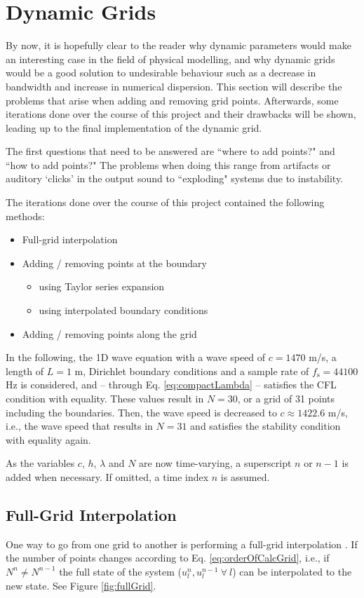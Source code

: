 \documentclass[dvipsnames, preprint]{JASA}
\begin{document}
\section{Dynamic Grids}
By now, it is hopefully clear to the reader why dynamic parameters would make an interesting case in the field of physical modelling, and why dynamic grids would be a good solution to undesirable behaviour such as a decrease in bandwidth and increase in numerical dispersion. This section will describe the problems that arise when adding and removing grid points. Afterwards, some iterations done over the course of this project and their drawbacks will be shown, leading up to the final implementation of the dynamic grid. 

The first questions that need to be answered are ``where to add points?" and ``how to add points?" The problems when doing this range from artifacts or auditory `clicks' in the output sound to ``exploding" systems due to instability.


The iterations done over the course of this project contained the following methods:
\begin{itemize}
    \item Full-grid interpolation
    \item Adding / removing points at the boundary
    \begin{itemize}
        \item using Taylor series expansion
        \item using interpolated boundary conditions
    \end{itemize}
    \item Adding / removing points along the grid
\end{itemize}
In the following, the 1D wave equation with a wave speed of $c = 1470$ m/s, a length of $L = 1$ m, Dirichlet boundary conditions and a sample rate of $f_\text{s} = 44100$ Hz is considered, and -- through Eq. \eqref{eq:compactLambda} -- satisfies the CFL condition with equality. These values result in $N = 30$, or a grid of 31 points including the boundaries. Then, the wave speed is decreased to $c \approx 1422.6$ m/s, i.e., the wave speed that results in $N=31$ and satisfies the stability condition with equality again. 

As the variables $c$, $h$, $\lambda$ and $N$ are now time-varying, a superscript $n$ or $n-1$ is added when necessary. If omitted, a time index $n$ is assumed.

\subsection{Full-Grid Interpolation}
One way to go from one grid to another is performing a full-grid interpolation \cite[Chap. 5]{bilbao2009}. If the number of points changes according to Eq. \eqref{eq:orderOfCalcGrid}, i.e., if $N^n \neq N^{n-1}$ the full state of the system ($u_l^n, u_l^{n-1}\ \forall\ l$)  can be interpolated to the new state. See Figure \ref{fig:fullGrid}. 
\end{document}
